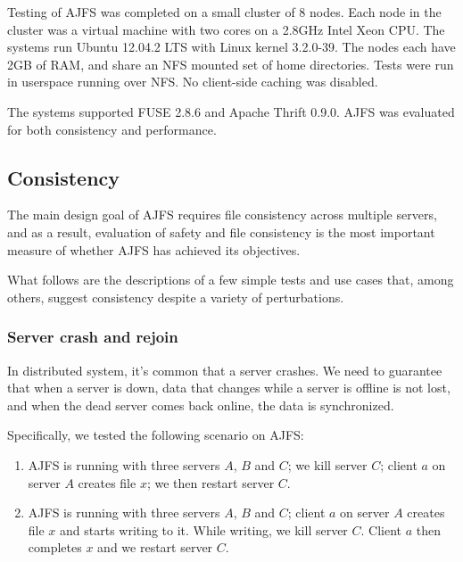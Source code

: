 Testing of AJFS was completed on a small cluster of 8 nodes. Each node in the
cluster was a virtual machine with two cores on a 2.8GHz Intel Xeon CPU. The
systems run Ubuntu 12.04.2 LTS with Linux kernel 3.2.0-39. The nodes each have
2GB of RAM, and share an NFS mounted set of home directories.  Tests were run in
userspace running over NFS. No client-side caching was disabled.

The systems supported FUSE 2.8.6 and Apache Thrift 0.9.0. AJFS was evaluated for
both consistency and performance.

\subsection{Consistency}
The main design goal of AJFS requires file consistency across multiple servers,
and as a result, evaluation of safety and file consistency is the most important
measure of whether AJFS has achieved its objectives.

What follows are the descriptions of a few simple tests and use cases that,
among others, suggest consistency despite a variety of perturbations. 

\subsubsection{Server crash and rejoin}

In distributed system, it's common that a server crashes. We need to guarantee
that when a server is down, data that changes while a server is offline is not
lost, and when the dead server comes back online, the data is synchronized.


Specifically, we tested the following scenario on AJFS:

\begin{enumerate}
    \item AJFS is running with three servers $A$, $B$ and $C$; we kill server
        $C$; client $a$ on server $A$ creates file $x$; we then restart server
        $C$.
    \item AJFS is running with three servers $A$, $B$ and $C$; client $a$
        on server $A$ creates file $x$ and starts writing to it. While writing, we kill server
        $C$. Client $a$ then completes $x$ and we restart server $C$.
\end{enumerate}

